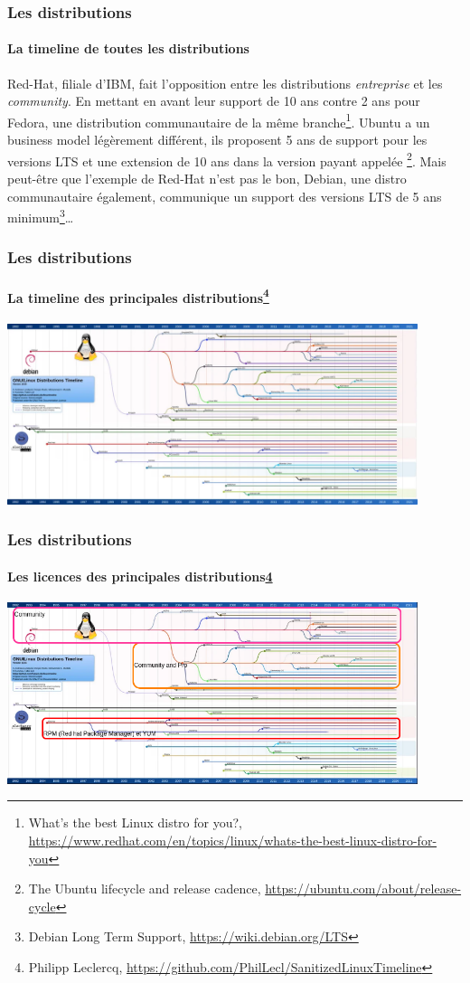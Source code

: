 \documentclass{beamer}
\begin{document}
    \begin{frame}
        \transdissolve
        \frametitle{Les distributions}
        \framesubtitle{La timeline de toutes les distributions}
        Red-Hat, filiale d'IBM, fait l'opposition entre les distributions \textit{entreprise} et les \textit{community}.
        En mettant en avant leur support de 10 ans contre 2 ans pour Fedora, une distribution communautaire de la même branche\footnote{What's the best Linux distro for you?, \url{https://www.redhat.com/en/topics/linux/whats-the-best-linux-distro-for-you}}.
        \bigbreak
        Ubuntu a un business model légèrement différent, ils proposent 5 ans de support pour les versions LTS et une extension de 10 ans dans la version payant appelée \footnote{The Ubuntu lifecycle and release cadence, \url{https://ubuntu.com/about/release-cycle}}.
        \bigbreak
        Mais peut-être que l'exemple de Red-Hat n'est pas le bon, Debian, une distro communautaire également, communique un support des versions LTS de 5 ans minimum\footnote{Debian Long Term Support, \url{https://wiki.debian.org/LTS}}\ldots
    \end{frame}

    \begin{frame}
        \transdissolve
        \frametitle{Les distributions}
        \framesubtitle{La timeline des principales distributions\footnote{\label{main-distro}Philipp Leclercq, \url{https://github.com/PhilLecl/SanitizedLinuxTimeline}}}
        \centering
        \includegraphics[width=12cm]{image/linux-main-distro-timeline}
    \end{frame}

    \begin{frame}
        \transdissolve
        \frametitle{Les distributions}
        \framesubtitle{Les licences des principales distributions\cref{main-distro}}
        \centering
        \includegraphics[width=12cm]{image/main-distro-license.drawio}
    \end{frame}
\end{document}
